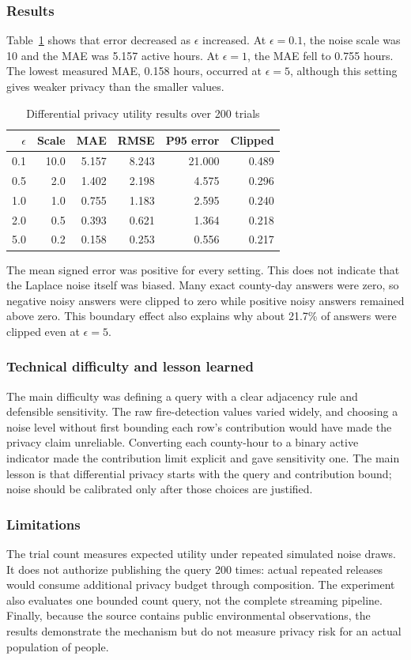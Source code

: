 \subsubsection{Results}
Table~\ref{tab:privacy-results} shows that error decreased as $\epsilon$ increased. At $\epsilon=0.1$, the noise scale was 10 and the MAE was 5.157 active hours. At $\epsilon=1$, the MAE fell to 0.755 hours. The lowest measured MAE, 0.158 hours, occurred at $\epsilon=5$, although this setting gives weaker privacy than the smaller values.

\begin{table}[htbp]
\centering
\caption{Differential privacy utility results over 200 trials}
\label{tab:privacy-results}
\begin{tabular}{r r r r r r}
\hline
$\epsilon$ & Scale & MAE & RMSE & P95 error & Clipped \\
\hline
0.1 & 10.0 & 5.157 & 8.243 & 21.000 & 0.489 \\
0.5 & 2.0 & 1.402 & 2.198 & 4.575 & 0.296 \\
1.0 & 1.0 & 0.755 & 1.183 & 2.595 & 0.240 \\
2.0 & 0.5 & 0.393 & 0.621 & 1.364 & 0.218 \\
5.0 & 0.2 & 0.158 & 0.253 & 0.556 & 0.217 \\
\hline
\end{tabular}
\end{table}

The mean signed error was positive for every setting. This does not indicate that the Laplace noise itself was biased. Many exact county-day answers were zero, so negative noisy answers were clipped to zero while positive noisy answers remained above zero. This boundary effect also explains why about 21.7\% of answers were clipped even at $\epsilon=5$.

\subsubsection{Technical difficulty and lesson learned}
The main difficulty was defining a query with a clear adjacency rule and defensible sensitivity. The raw fire-detection values varied widely, and choosing a noise level without first bounding each row's contribution would have made the privacy claim unreliable. Converting each county-hour to a binary active indicator made the contribution limit explicit and gave sensitivity one. The main lesson is that differential privacy starts with the query and contribution bound; noise should be calibrated only after those choices are justified.

\subsubsection{Limitations}
The trial count measures expected utility under repeated simulated noise draws. It does not authorize publishing the query 200 times: actual repeated releases would consume additional privacy budget through composition. The experiment also evaluates one bounded count query, not the complete streaming pipeline. Finally, because the source contains public environmental observations, the results demonstrate the mechanism but do not measure privacy risk for an actual population of people.
